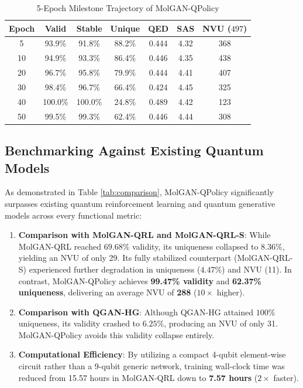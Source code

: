 \documentclass[10pt,twocolumn,a4paper]{article}
\begin{document}
\begin{table}[h]
\centering
\footnotesize
\caption{5-Epoch Milestone Trajectory of MolGAN-QPolicy}
\label{tab:milestones}
\setlength{\tabcolsep}{3.5pt}
\begin{tabular*}{\columnwidth}{@{\extracolsep{\fill}}ccccccc@{}}
\toprule
\textbf{Epoch} & \textbf{Valid} & \textbf{Stable} & \textbf{Unique} & \textbf{QED} & \textbf{SAS} & \textbf{NVU ($497$)} \\
\midrule
5  & 93.9\% & 91.8\% & 88.2\% & 0.444 & 4.32 & 368 \\
10 & 94.9\% & 93.3\% & 86.4\% & 0.446 & 4.35 & 438 \\
20 & 96.7\% & 95.8\% & 79.9\% & 0.444 & 4.41 & 407 \\
30 & 98.4\% & 96.7\% & 66.4\% & 0.424 & 4.45 & 325 \\
40 & 100.0\% & 100.0\% & 24.8\% & 0.489 & 4.42 & 123 \\
50 & 99.5\% & 99.3\% & 62.4\% & 0.446 & 4.44 & 308 \\
\bottomrule
\end{tabular*}
\end{table}

\subsection{Benchmarking Against Existing Quantum Models}
As demonstrated in Table \ref{tab:comparison}, MolGAN-QPolicy significantly surpasses existing quantum reinforcement learning and quantum generative models across every functional metric:
\begin{enumerate}
    \item \textbf{Comparison with MolGAN-QRL and MolGAN-QRL-S}: While MolGAN-QRL reached $69.68\%$ validity, its uniqueness collapsed to $8.36\%$, yielding an NVU of only 29. Its fully stabilized counterpart (MolGAN-QRL-S) experienced further degradation in uniqueness ($4.47\%$) and NVU (11). In contrast, MolGAN-QPolicy achieves \textbf{99.47\% validity} and \textbf{62.37\% uniqueness}, delivering an average NVU of \textbf{288} ($10\times$ higher).
    \item \textbf{Comparison with QGAN-HG}: Although QGAN-HG attained $100\%$ uniqueness, its validity crashed to $6.25\%$, producing an NVU of only 31. MolGAN-QPolicy avoids this validity collapse entirely.
    \item \textbf{Computational Efficiency}: By utilizing a compact 4-qubit element-wise circuit rather than a 9-qubit generic network, training wall-clock time was reduced from 15.57 hours in MolGAN-QRL down to \textbf{7.57 hours} ($2\times$ faster).
\end{enumerate}
\end{document}
